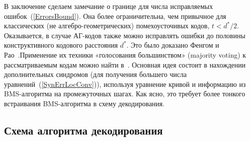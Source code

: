 \documentclass[14pt]{extarticle}
\begin{document}
В заключение сделаем замечание о границе для числа исправляемых
ошибок~(\ref{ErrorsBound}). Она более ограничительна, чем привычное для
классических (не алгебро-геометрических) помехоусточивых кодов, $t < d^*/2$.
Оказывается, в случае АГ-кодов также можно исправлять ошибки до половины
конструктивного кодового расстояния $d^*$. Это было доказано Фенгом и
Рао~\cite{FengRao93}.Применение их техники «голосования большинством» (majority
voting) к рассматриваемым кодам можно найти в~\cite{Sakata95}. Основная идея
состоит в нахождении дополнительных синдромов (для получения большего числа
уравнений~(\ref{SynErrLocConv})), используя уравнение кривой и информацию из
BMS-алгоритма на промежуточных шагах. Как ясно, это требует более тонкого
встраивания BMS-алгоритма в схему декодирования.

\subsection{Схема алгоритма декодирования}
\label{DecodingScheme}

\begin{center}\end{center}
\end{document}
